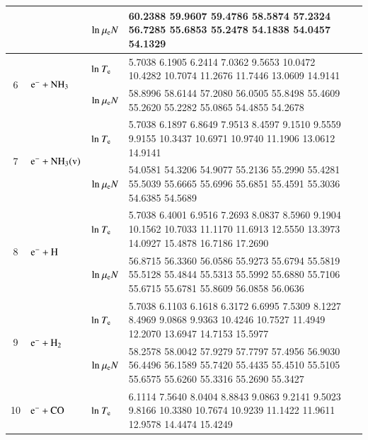 \documentclass{warpdoc}
\begin{document}
\begin{table}[!htbp]
\begin{threeparttable}
\begin{tabular*}{\textwidth}{c@{\extracolsep{\fill}}llll}
  &  & ${\rm ln}~\mu_{\rm e}N$   & \tiny 60.2388   59.9607   59.4786   58.5874   57.2324   56.7285   55.6853   55.2478   54.1838   54.0457   54.1329 \\ 
  \midrule  
  \multirow{2}{*}{6} &  \multirow{2}{*}{ $\rm e^- + NH_3  $   } & ${\rm ln}~T_{\rm e}$  & \tiny     5.7038    6.1905    6.2414    7.0362    9.5653   10.0472   10.4282   10.7074   11.2676   11.7446   13.0609   14.9141 \\
  &  & ${\rm ln}~\mu_{\rm e}N$   & \tiny 58.8996   58.6144   57.2080   56.0505   55.8498   55.4609   55.2620   55.2282   55.0865   54.4855   54.2678 \\
    \midrule  
  \multirow{2}{*}{7} &  \multirow{2}{*}{ $\rm e^- + NH_3(v)  $   } & ${\rm ln}~T_{\rm e}$  & \tiny         5.7038    6.1897    6.8649    7.9513    8.4597    9.1510    9.5559    9.9155   10.3437   10.6971   10.9740   11.1906   13.0612   14.9141
 \\
  &  & ${\rm ln}~\mu_{\rm e}N$   & \tiny    54.0581   54.3206   54.9077   55.2136   55.2990   55.4281   55.5039   55.6665   55.6996   55.6851   55.4591   55.3036   54.6385   54.5689
 \\
     \midrule  
  \multirow{2}{*}{8} &  \multirow{2}{*}{ $\rm e^- + H  $   } & ${\rm ln}~T_{\rm e}$  & \tiny         5.7038         6.4001    6.9516    7.2693    8.0837    8.5960    9.1904   10.1562   10.7033   11.1170   11.6913   12.5550   13.3973   14.0927   15.4878   16.7186   17.2690
 \\
  &  & ${\rm ln}~\mu_{\rm e}N$   & \tiny   56.8715     56.3360   56.0586   55.9273   55.6794   55.5819   55.5128   55.4844   55.5313   55.5992   55.6880   55.7106   55.6715   55.6781   55.8609   56.0858   56.0636
 \\
     \midrule  
  \multirow{2}{*}{9} &  \multirow{2}{*}{ $\rm e^- + H_2  $   } & ${\rm ln}~T_{\rm e}$  & \tiny   5.7038    6.1103    6.1618    6.3172    6.6995    7.5309    8.1227    8.4969    9.0868    9.9363   10.4246   10.7527   11.4949   12.2070   13.6947   14.7153   15.5977

 \\
  &  & ${\rm ln}~\mu_{\rm e}N$   & \tiny    58.2578   58.0042   57.9279   57.7797   57.4956   56.9030   56.4496   56.1589   55.7420   55.4435   55.4510   55.5105   55.6575   55.6260   55.3316   55.2690   55.3427

 \\
 
     \midrule  
  \multirow{2}{*}{10} &  \multirow{2}{*}{ $\rm e^- + CO  $   } & ${\rm ln}~T_{\rm e}$  & \tiny       6.1114    7.5640    8.0404    8.8843    9.0863    9.2141    9.5023    9.8166   10.3380   10.7674   10.9239   11.1422   11.9611   12.9578   14.4474   15.4249



\end{tabular*}
\end{threeparttable}
\end{table}
\end{document}
